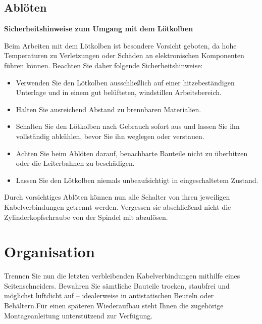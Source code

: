 \section{Ablöten}
\textbf{Sicherheitshinweise zum Umgang mit dem Lötkolben}

Beim Arbeiten mit dem Lötkolben ist besondere Vorsicht geboten, da hohe Temperaturen zu Verletzungen oder Schäden an elektronischen Komponenten führen können. Beachten Sie daher folgende Sicherheitshinweise:

\begin{itemize}
	\item Verwenden Sie den Lötkolben ausschließlich auf einer hitzebeständigen Unterlage und in einem gut belüfteten, windstillen Arbeitsbereich.
	\item Halten Sie ausreichend Abstand zu brennbaren Materialien.
	\item Schalten Sie den Lötkolben nach Gebrauch sofort aus und lassen Sie ihn vollständig abkühlen, bevor Sie ihn weglegen oder verstauen.
	\item Achten Sie beim Ablöten darauf, benachbarte Bauteile nicht zu überhitzen oder die Leiterbahnen zu beschädigen.
	\item Lassen Sie den Lötkolben niemals unbeaufsichtigt in eingeschaltetem Zustand.
\end{itemize}


Durch vorsichtiges Ablöten können nun alle Schalter von ihren jeweiligen Kabelverbindungen getrennt werden. Vergessen sie abschließend nicht die Zylinderkopfschraube von der Spindel mit abzulösen.

\chapter{Organisation}

Trennen Sie nun die letzten verbleibenden Kabelverbindungen mithilfe eines Seitenschneiders.
Bewahren Sie sämtliche Bauteile trocken, staubfrei und möglichst luftdicht auf – idealerweise in antistatischen Beuteln oder Behältern.Für einen späteren Wiederaufbau steht Ihnen die zugehörige Montageanleitung unterstützend zur Verfügung.